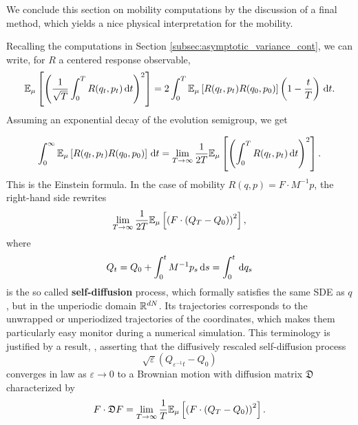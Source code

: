 We conclude this section on mobility computations by the discussion of a final method, which yields a nice physical interpretation for the mobility.
\begin{remark}
    Recalling the computations in Section \ref{subsec:asymptotic_variance_cont}, we can write, for $R$ a centered response observable,
    \begin{equation}
        \mathbb{E}_\mu\left[\left(\frac1{\sqrt{T}}\int_0^T R(q_t,p_t)\,\mathrm{d} t\right)^2\right]=2\int_0^T \mathbb{E}_\mu\left[R(q_t,p_t)R(q_0,p_0)\right]\left(1-\frac{t}T\right)\,\mathrm{d} t.
    \end{equation}
    Assuming an exponential decay of the evolution semigroup, we get 

    \begin{equation}
        \label{eq:einstein_formula}
        \int_0^\infty\mathbb{E}_\mu\left[R(q_t,p_t)R(q_0,p_0)\right]\,\mathrm{d} t=\underset{T\to\infty}{\lim}\,\frac{1}{2T}\mathbb{E}_\mu\left[\left(\int_0^T R(q_t,p_t)\,\mathrm{d} t\right)^2\right].
    \end{equation}
    This is the Einstein formula. In the case of mobility $R(q,p)=F\cdot M^{-1}p$, the right-hand side rewrites 
    \begin{equation}
        \label{eq:einstein_formula_mobility}
        \underset{T\to\infty}{\lim}\,\frac{1}{2T}\mathbb{E}_\mu\left[\left(F\cdot \left(Q_T-Q_0\right)\right)^2\right],
    \end{equation}
    where 
    \begin{equation}
        \label{eq:self_diffusion_process}
        Q_t=Q_0+\int_0^t M^{-1}p_s\,\mathrm{d} s=\int_0^t \,\mathrm{d} q_s
    \end{equation}
    is the so called \textbf{self-diffusion} process, which formally satisfies the same SDE as $q$, but in the unperiodic domain $\mathbb{R}^{dN}$. 
    Its trajectories corresponds to the unwrapped or unperiodized trajectories of the coordinates, which makes them particularly easy monitor during a numerical simulation.
    This terminology is justified by a result, \cite[Theorem 1]{R89}, asserting that the diffusively rescaled self-diffusion process 
    \[\sqrt{\varepsilon}(Q_{\varepsilon^{-1}t}-Q_0)\]
    converges in law as $\varepsilon \to 0$ to a Brownian motion with diffusion matrix $\mathfrak D$ characterized by
    \begin{equation}
        \label{eq:diffusion_tensor}
        F\cdot \mathfrak D F= \underset{T\to\infty}{\lim}\,\frac{1}{T}\mathbb{E}_\mu\left[\left(F\cdot \left(Q_T-Q_0\right)\right)^2\right].
    \end{equation}

\end{remark}
